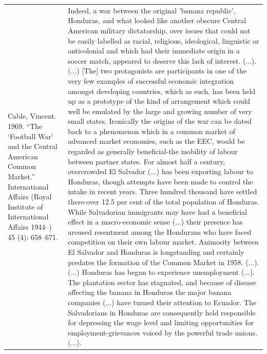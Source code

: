 {\begin{longtable}{p{}p{}}
\\
Cable, Vincent. 1969. “The ‘Football War’ and the Central American Common Market.” International Affairs (Royal Institute of International Affairs 1944–) 45 (4): 658–671. & Indeed, a war between the original 'banana republic', Honduras, and what looked like another obscure Central American military dictatorship, over issues that could not be easily labelled as racial, religious, ideological, linguistic or anticolonial and which had their immediate origin in a soccer match, appeared to deserve this lack of interest. (...). (...) [The] two protagonists are participants in one of the very few examples of successful economic integration amongst developing countries, which as such, has been held up as a prototype of the kind of arrangement which could well be emulated by the large and growing number of very small states. Ironically the origins of the war can be dated back to a phenomenon which in a common market of advanced market economies, such as the EEC, would be regarded as generally beneficial-the mobility of labour between partner states. For almost half a century, overcrowded El Salvador (...) has been exporting labour to Honduras, though attempts have been made to control the intake in recent years. Three hundred thousand have settled there-over 12.5 per cent of the total population of Honduras. While Salvadorian immigrants may have had a beneficial effect in a macro-economic sense (...) their presence has aroused resentment among the Hondurans who have faced competition on their own labour market. Animosity between El Salvador and Honduras is longstanding and certainly predates the formation of the Common Market in 1958. (...). (...) Honduras has begun to experience unemployment (...). The plantation sector has stagnated, and because of disease affecting the banana in Honduras the major banana companies (...) have turned their attention to Ecuador. The Salvadorians in Honduras are consequently held responsible for depressing the wage level and limiting opportunities for employment-grievances voiced by the powerful trade unions. (...). 

\end{longtable}}
